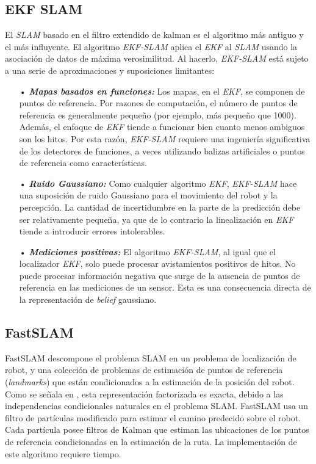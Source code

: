 \subsection{EKF SLAM}
El \textit{SLAM} basado en el filtro extendido de kalman es el algoritmo m\'as antiguo y el m\'as influyente. El
algoritmo \textit{EKF-SLAM} aplica el \textit{EKF} al \textit{SLAM} usando la asociaci\'on de datos de m\'axima 
verosimilitud. Al hacerlo, \textit{EKF-SLAM} est\'a sujeto a una serie de aproximaciones y suposiciones
limitantes:
\begin{itemize}
	\item[•] \textit{\textbf{Mapas basados en funciones:}} Los mapas, en el \textit{EKF}, se componen de puntos
	de referencia. Por razones de computaci\'on, el n\'umero de puntos de referencia es generalmente
	peque\~no (por ejemplo, m\'as peque\~no que 1000). Adem\'as, el enfoque de \textit{EKF} tiende a
	funcionar bien cuanto menos ambiguos son los hitos. Por esta raz\'on, \textit{EKF-SLAM} requiere una
	ingenier\'ia significativa de los detectores de funciones, a veces utilizando balizas
	artificiales o puntos de referencia como caracter\'isticas.
	\item[•] \textit{\textbf{Ruido Gaussiano:}} Como cualquier algoritmo \textit{EKF}, \textit{EKF-SLAM} 
	hace una suposici\'on de ruido Gaussiano para el movimiento del robot y la percepci\'on. La
	cantidad de incertidumbre en la parte de la predicci\'on debe ser relativamente
	peque\~na, ya que de lo contrario la linealizaci\'on en \textit{EKF} tiende a introducir 
	errores intolerables.
	\item[•] \textit{\textbf{Mediciones positivas:}} El algoritmo \textit{EKF-SLAM}, al igual 
	que el localizador \textit{EKF}, solo puede procesar avistamientos positivos de hitos. No
	puede procesar informaci\'on negativa que surge de la ausencia de puntos de referencia en 
	las mediciones de un sensor. Esta es una consecuencia directa de la representaci\'on
	de \textit{belief} gaussiano.
\end{itemize}

\subsection{FastSLAM}
FastSLAM descompone el problema SLAM en un problema de localizaci\'on 
de robot, y una colecci\'on de problemas de estimaci\'on de puntos 
de referencia (\textit{landmarks}) que est\'an condicionados a la 
estimaci\'on de la posici\'on del robot. Como se se\~nala en 
\cite{murphy2000bayesian}, esta representaci\'on factorizada es 
exacta, debido a las independencias condicionales naturales en el 
problema SLAM. FastSLAM usa un filtro de part\'iculas modificado 
para estimar el camino predecido sobre el robot. Cada part\'icula 
posee filtros de Kalman que estiman las ubicaciones de los puntos 
de referencia condicionadas en la estimaci\'on de la ruta. La 
implementaci\'on de este algoritmo requiere tiempo.

